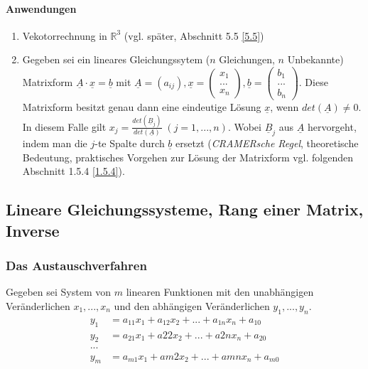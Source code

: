 \paragraph{Anwendungen}
\begin{enumerate}
\item Vekotorrechnung in $\mathbb{R}^3$ (vgl. später, Abschnitt 5.5 \ref{5.5})
\item Gegeben sei ein lineares Gleichungssytem ($n$ Gleichungen, $n$ Unbekannte)\\
Matrixform $\boxed{\underline{A}\cdot \underline{x}=\underline{b}}$ mit $\underline{A}=(a_{ij}), \underline{x}=\begin{pmatrix}
x_1\\
...\\
x_n
\end{pmatrix}, \underline{b}=\begin{pmatrix}
b_1\\
...\\
b_n
\end{pmatrix}$. Diese Matrixform besitzt genau dann eine eindeutige Lösung $\underline{x}$, wenn $det(\underline{A})\not = 0$. \\
In diesem Falle gilt $\boxed{x_j=\frac{det(\underline{B}_j)}{det(\underline{A})}}\; (j=1,...,n)$. Wobei $\underline{B}_j$ aus $\underline{A}$ hervorgeht, indem man die $j$-te Spalte durch $\underline{b}$ ersetzt (\emph{CRAMERsche Regel}, theoretische Bedeutung, praktisches Vorgehen zur Lösung der Matrixform vgl. folgenden Abschnitt 1.5.4 \ref{1.5.4}).
\end{enumerate}

\subsection{Lineare Gleichungssysteme, Rang einer Matrix, Inverse}
\subsubsection{Das Austauschverfahren}
Gegeben sei System von $m$ linearen Funktionen mit den unabhängigen Veränderlichen $x_1,...,x_n$ und den abhängigen Veränderlichen $y_1,...,y_n$.
\begin{align*}
y_1&= a_{11}x_{1}+a_{12}x_{2}+...+a_{1n}x_{n}+a_{10}\\
y_2&= a_{21}x_{1}+a{22}x_{2}+...+a{2n}x_{n}+a_{20}\\
...\\
y_m&=a_{m1}x_{1}+a{m2}x_{2}+...+a{mn}x_{n}+a_{m0}
\end{align*}

